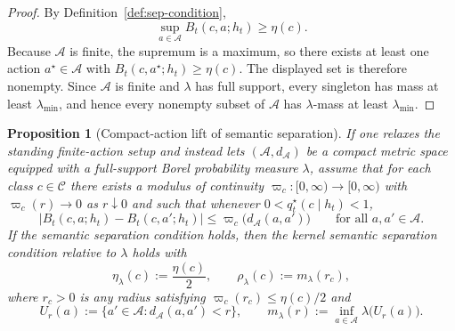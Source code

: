 \documentclass[11pt]{article}
\newtheorem{proposition}[theorem]{Proposition}
\theoremstyle{definition}
\theoremstyle{remark}
\newcommand{\Acal}{\mathcal{A}}
\newcommand{\Ccal}{\mathcal{C}}
\begin{document}
\begin{proof}
By Definition~\ref{def:sep-condition},
\[
\sup_{a\in\Acal}B_t(c,a;h_t)\ge \eta(c).
\]
Because $\Acal$ is finite, the supremum is a maximum, so there exists at least one action $a^\star\in\Acal$ with $B_t(c,a^\star;h_t)\ge \eta(c)$. The displayed set is therefore nonempty. Since $\Acal$ is finite and $\lambda$ has full support, every singleton has mass at least $\lambda_{\min}$, and hence every nonempty subset of $\Acal$ has $\lambda$-mass at least $\lambda_{\min}$.
\end{proof}

\begin{proposition}[Compact-action lift of semantic separation]
\label{prop:compact-action-kernel-separation}
If one relaxes the standing finite-action setup and instead lets $(\Acal,d_\Acal)$ be a compact metric space equipped with a full-support Borel probability measure $\lambda$, assume that for each class $c\in\Ccal$ there exists a modulus of continuity $\varpi_c:[0,\infty)\to[0,\infty)$ with $\varpi_c(r)\to 0$ as $r\downarrow 0$ and such that whenever $0<q_t^\star(c\mid h_t)<1$,
\[
\bigl|B_t(c,a;h_t)-B_t(c,a';h_t)\bigr|
\le
\varpi_c\!\bigl(d_\Acal(a,a')\bigr)
\qquad
\text{for all }a,a'\in\Acal.
\]
If the semantic separation condition holds, then the kernel semantic separation condition relative to $\lambda$ holds with
\[
\eta_\lambda(c):=\frac{\eta(c)}{2},
\qquad
\rho_\lambda(c):=m_\lambda(r_c),
\]
where $r_c>0$ is any radius satisfying $\varpi_c(r_c)\le \eta(c)/2$ and
\[
U_r(a):=\{a'\in\Acal:d_\Acal(a,a')<r\},
\qquad
m_\lambda(r):=\inf_{a\in\Acal}\lambda\!\bigl(U_r(a)\bigr).
\]
\end{proposition}
\end{document}
